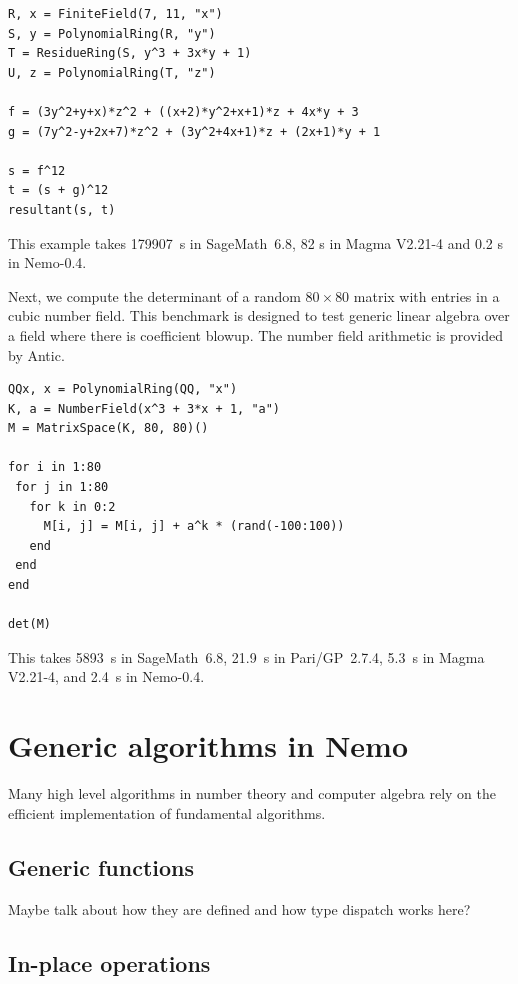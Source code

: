\documentclass{sig-alternate-05-2015}
\begin{document}
\begin{verbatim}
R, x = FiniteField(7, 11, "x")
S, y = PolynomialRing(R, "y")
T = ResidueRing(S, y^3 + 3x*y + 1)
U, z = PolynomialRing(T, "z")

f = (3y^2+y+x)*z^2 + ((x+2)*y^2+x+1)*z + 4x*y + 3
g = (7y^2-y+2x+7)*z^2 + (3y^2+4x+1)*z + (2x+1)*y + 1

s = f^12
t = (s + g)^12
resultant(s, t)
\end{verbatim}

This example takes 179907~s in SageMath~6.8, 82 s in Magma V2.21-4
and 0.2 s in Nemo-0.4.

Next, we compute the determinant of a random $80\times80$ matrix
with entries in a cubic number field.
This benchmark is designed to test generic linear algebra over a field
where there is coefficient blowup. The number field arithmetic is
provided by Antic.

\begin{verbatim}
QQx, x = PolynomialRing(QQ, "x")
K, a = NumberField(x^3 + 3*x + 1, "a")
M = MatrixSpace(K, 80, 80)()

for i in 1:80
 for j in 1:80
   for k in 0:2
     M[i, j] = M[i, j] + a^k * (rand(-100:100))
   end
 end
end

det(M)
\end{verbatim}

This takes 5893~s in SageMath~6.8, 21.9~s in Pari/GP~2.7.4, 5.3~s in Magma V2.21-4,
and 2.4~s in Nemo-0.4.

\section{Generic algorithms in Nemo}

Many high level algorithms in number theory and computer algebra rely on
the efficient implementation of fundamental algorithms.

\subsection{Generic functions}

Maybe talk about how they are defined and how type dispatch works here?

\subsection{In-place operations}
\end{document}
